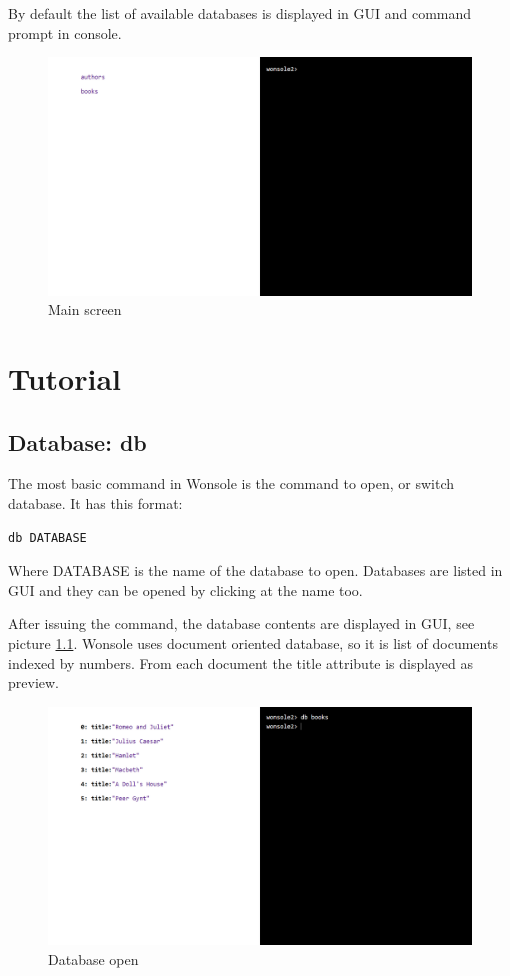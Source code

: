 \documentclass[10pt,a4paper,oneside]{report}
\begin{document}
By default the list of available databases is displayed in GUI and
command prompt in console.


\begin{figure}
\centering
\includegraphics[width=\textwidth]{screenshot/wonsole2/wonsole2-00.png}
\caption{Main screen}
\label{wonsole2-00}
\end{figure}

\chapter{Tutorial}

\section{Database: db}
The most basic command in Wonsole is the command to open, or switch database. It
has this format:
\begin{verbatim}
db DATABASE
\end{verbatim}
Where DATABASE is the name of the database to open. Databases are listed in GUI
and they can be opened by clicking at the name too.

After issuing the command, the database contents are displayed in GUI, see
picture \ref{wonsole2-02}.
Wonsole uses document oriented database, so it is list of documents indexed by numbers.
From each document the title attribute is displayed as preview.


\begin{figure}
\centering
\includegraphics[width=\textwidth]{screenshot/wonsole2/wonsole2-02.png}
\caption{Database open}
\label{wonsole2-02}
\end{figure}
\end{document}
